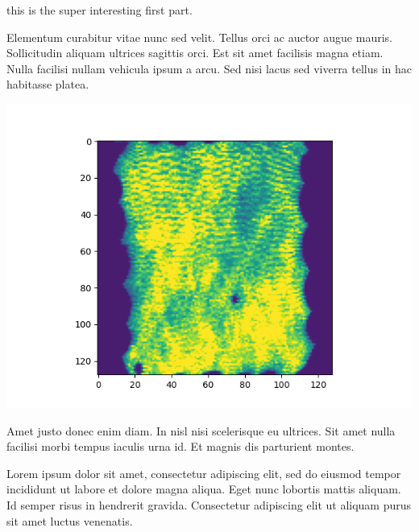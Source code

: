 {
    this is the super interesting first part.
    
    \vspace{10pt}
    
    
    \vspace{10pt}
    
    Elementum curabitur vitae nunc sed velit. Tellus orci ac auctor augue mauris. Sollicitudin aliquam ultrices sagittis orci. Est sit amet facilisis magna etiam. Nulla facilisi nullam vehicula ipsum a arcu. Sed nisi lacus sed viverra tellus in hac habitasse platea.
    \begin{tikzfigure}
    \label{fig:fig1}
     \includegraphics[width=0.8\colwidth]{Figure/7100_0.png}
    \end{tikzfigure}
    
    \vspace{10pt}

     Amet justo donec enim diam. In nisl nisi scelerisque eu ultrices. Sit amet nulla facilisi morbi tempus iaculis urna id. Et magnis dis parturient montes.
}

\begin{subcolumns}
{
    Lorem ipsum dolor sit amet, consectetur adipiscing elit, sed do eiusmod tempor incididunt ut labore et dolore magna aliqua. Eget nunc lobortis mattis aliquam. Id semper risus in hendrerit gravida. Consectetur adipiscing elit ut aliquam purus sit amet luctus venenatis. 
}
{
}
\end{subcolumns}
